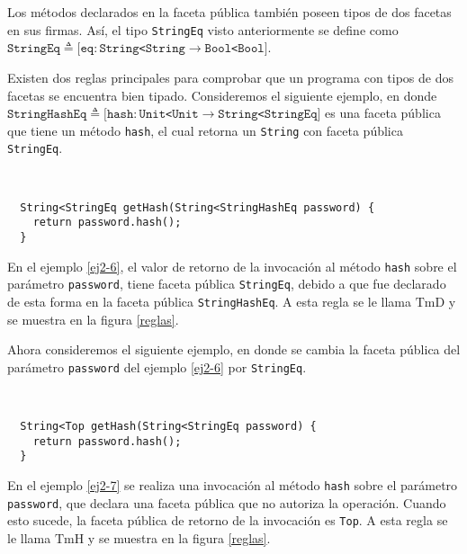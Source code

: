Los métodos declarados en la faceta pública también poseen tipos de dos facetas en sus firmas. Así, el tipo \texttt{StringEq} visto anteriormente se define como $\mathtt{StringEq} \triangleq [\mathtt{eq} : \mathtt{String}$\texttt{<}$\mathtt{String} \rightarrow \mathtt{Bool}$\texttt{<}$\mathtt{Bool}]$.

Existen dos reglas principales para comprobar que un programa con tipos de dos facetas se encuentra bien tipado. Consideremos el siguiente ejemplo, en donde $\mathtt{StringHashEq} \triangleq [\mathtt{hash} : \mathtt{Unit}$\texttt{<}$\mathtt{Unit} \rightarrow \mathtt{String}$\texttt{<}$\mathtt{StringEq}]$ es una faceta pública que tiene un método \texttt{hash}, el cual retorna un \texttt{String} con faceta pública \texttt{StringEq}.

\begin{ej} \ \\
  \normalfont
  \label{ej2-6}
\begin{lstlisting}
  String<StringEq getHash(String<StringHashEq password) {
  	return password.hash();
  }
\end{lstlisting}
\end{ej}

En el ejemplo \ref{ej2-6}, el valor de retorno de la invocación al método \texttt{hash} sobre el parámetro \texttt{password}, tiene faceta pública \texttt{StringEq}, debido a que fue declarado de esta forma en la faceta pública \texttt{StringHashEq}. A esta regla se le llama $\text{TmD}$ y se muestra en la figura \ref{reglas}.

Ahora consideremos el siguiente ejemplo, en donde se cambia la faceta pública del parámetro \texttt{password} del ejemplo \ref{ej2-6} por \texttt{StringEq}.

\begin{ej} \ \\
  \normalfont
  \label{ej2-7}
\begin{lstlisting}
  String<Top getHash(String<StringEq password) {
  	return password.hash();
  }
\end{lstlisting}
\end{ej}

\clearpage
En el ejemplo \ref{ej2-7} se realiza una invocación al método \texttt{hash} sobre el parámetro \texttt{password}, que declara una faceta pública que no autoriza la operación. Cuando esto sucede, la faceta pública de retorno de la invocación es \texttt{Top}. A esta regla se le llama $\text{TmH}$ y se muestra en la figura \ref{reglas}.

